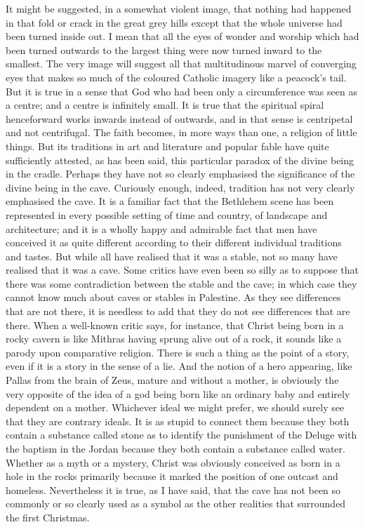 It might be suggested, in a somewhat violent image, that nothing had happened in that fold or crack in the great grey hills except that the whole universe had been turned inside out. I mean that all the eyes of wonder and worship which had been turned outwards to the largest thing were now turned inward to the smallest. The very image will suggest all that multitudinous marvel of converging eyes that makes so much of the coloured Catholic imagery like a peacock's tail. But it is true in a sense that God who had been only a circumference was seen as a centre; and a centre is infinitely small. It is true that the spiritual spiral henceforward works inwards instead of outwards, and in that sense is centripetal and not centrifugal. The faith becomes, in more ways than one, a religion of little things. But its traditions in art and literature and popular fable have quite sufficiently attested, as has been said, this particular paradox of the divine being in the cradle. Perhaps they have not so clearly emphasised the significance of the divine being in the cave. Curiously enough, indeed, tradition has not very clearly emphasised the cave. It is a familiar fact that the Bethlehem scene has been represented in every possible setting of time and country, of landscape and architecture; and it is a wholly happy and admirable fact that men have conceived it as quite different according to their different individual traditions and tastes. But while all have realised that it was a stable, not so many have realised that it was a cave. Some critics have even been so silly as to suppose that there was some contradiction between the stable and the cave; in which case they cannot know much about caves or stables in Palestine. As they see differences that are not there, it is needless to add that they do not see differences that are there. When a well-known critic says, for instance, that Christ being born in a rocky cavern is like Mithras having sprung alive out of a rock, it sounds like a parody upon comparative religion. There is such a thing as the point of a story, even if it is a story in the sense of a lie. And the notion of a hero appearing, like Pallas from the brain of Zeus, mature and without a mother, is obviously the very opposite of the idea of a god being born like an ordinary baby and entirely dependent on a mother. Whichever ideal we might prefer, we should surely see that they are contrary ideals. It is as stupid to connect them because they both contain a substance called stone as to identify the punishment of the Deluge with the baptism in the Jordan because they both contain a substance called water. Whether as a myth or a mystery, Christ was obviously conceived as born in a hole in the rocks primarily because it marked the position of one outcast and homeless. Nevertheless it is true, as I have said, that the cave has not been so commonly or so clearly used as a symbol as the other realities that surrounded the first Christmas.

